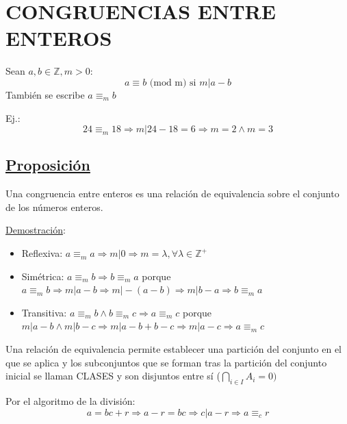 \documentclass[10pt,a4paper,openright]{book}
\begin{document}
\section*{CONGRUENCIAS ENTRE ENTEROS}
Sean $a,b\in \mathbb Z, m>0$:
$$a\equiv b\mbox{ (mod m) si }m|a-b$$
También se escribe $a\equiv_m b$\par
Ej.:
$$24\equiv_m 18\Rightarrow m|24-18=6\Rightarrow m=2 \wedge m=3$$
\subsection*{\underline{Proposición}}
Una congruencia entre enteros es una relación de equivalencia sobre el conjunto de los números enteros.\par
\underline{Demostración}:
\begin{itemize}
\item Reflexiva: $a\equiv_m a\Rightarrow m|0\Rightarrow m=\lambda, \forall \lambda \in \mathbb Z^+$
\item Simétrica: $a\equiv_m b \Rightarrow b\equiv_m a$ porque $a\equiv_m b \Rightarrow m|a-b \Rightarrow m|-(a-b) \Rightarrow m|b-a \Rightarrow b\equiv_m a$
\item Transitiva: $a\equiv_m b \wedge b\equiv_m c \Rightarrow a\equiv_m c$ porque $m|a-b \wedge m|b-c\Rightarrow m|a-b+b-c\Rightarrow m|a-c \Rightarrow a\equiv_m c$
\end{itemize}
Una relación de equivalencia permite establecer una partición del conjunto en el que se aplica y los subconjuntos que se forman tras la partición del conjunto inicial se llaman CLASES y son disjuntos entre sí ($\bigcap_{i\in I} A_i=0)$\par
Por el algoritmo de la división:
$$a=bc+r\Rightarrow a-r=bc\Rightarrow c|a-r\Rightarrow a\equiv_c r$$
\end{document}
